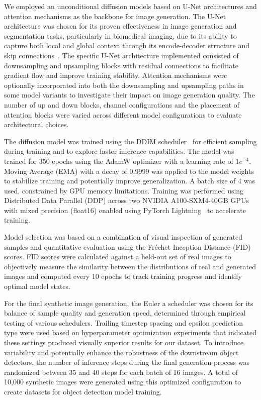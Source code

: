 We employed an unconditional diffusion models based on U-Net architectures and attention mechanisms as the backbone for image generation.
The U-Net architecture was chosen for its proven effectiveness in image generation and segmentation tasks, particularly in biomedical imaging, due to its ability to capture both local and global context through its encode-decoder structure and skip connections~\cite{ronneberger_u-net_2015}.
The specific U-Net architecture implemented consisted of downsampling and upsampling blocks with residual connections to facilitate gradient flow and improve training stability.
Attention mechanisms were optionally incorporated into both the downsampling and upsampling paths in some model variants to investigate their impact on image generation quality.
The number of up and down blocks, channel configurations and the placement of attention blocks were varied across different model configurations to evaluate architectural choices.

The diffusion model was trained using the DDIM scheduler~\cite{song_denoising_2020} for efficient sampling during training and to explore faster inference capabilities.
The model was trained for 350 epochs using the AdamW optimizer with a learning rate of $1e^{-4}$.
Moving Average (EMA) with a decay of 0.9999 was applied to the model weights to stabilize training and potentially improve generalization.
A batch size of 4 was used, constrained by GPU memory limitations.
Training was performed using Distributed Data Parallel (DDP) across two NVIDIA A100-SXM4-40GB GPUs with mixed precision (float16) enabled using PyTorch Lightning~\cite{falcon_pytorchlightningpytorch-lightning_2020} to accelerate training.

Model selection was based on a combination of visual inspection of generated samples and quantitative evaluation using the Fréchet Inception Distance (FID) scores.
FID scores were calculated against a held-out set of real images to objectively measure the similarity between the distributions of real and generated images and computed every 10 epochs to track training progress and identify optimal model states.

For the final synthetic image generation, the Euler a scheduler was chosen for its balance of sample quality and generation speed, determined through empirical testing of various schedulers.
Trailing timestep spacing and epsilon prediction type were used based on hyperparameter optimization experiments that indicated these settings produced visually superior results for our dataset.
To introduce variability and potentially enhance the robustness of the downstream object detectors, the number of inference steps during the final generation process was randomized between 35 and 40 steps for each batch of 16 images.
A total of 10,000 synthetic images were generated using this optimized configuration to create datasets for object detection model training.

